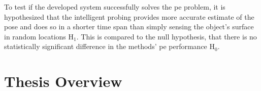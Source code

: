 To test if the developed system successfully solves the \gls{pe} problem, it is hypothesized that the intelligent probing provides more accurate estimate of the pose and does so in a shorter time span than simply sensing the object's surface in random locations $\text{H}_1$. This is compared to the null hypothesis, that there is no statistically significant difference in the methods' \gls{pe} performance $\text{H}_0$.





\section{Thesis Overview}\label{sec:intro-thesis-overview}

